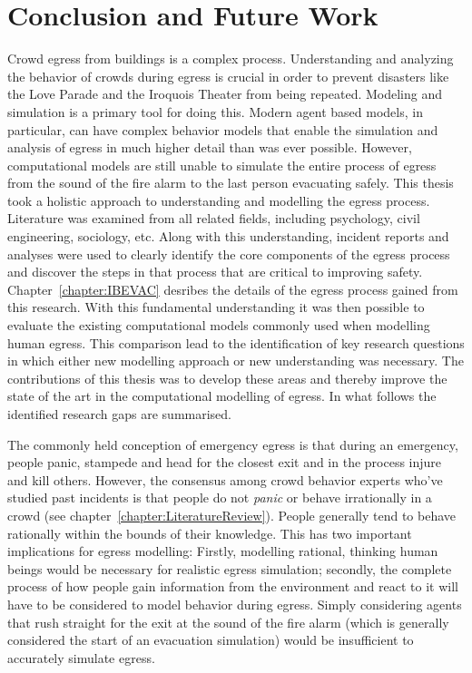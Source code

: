 \chapter{Conclusion and Future Work}
\label{chapter:finale}

Crowd egress from buildings is a complex process. Understanding and analyzing the behavior of crowds during egress is crucial in order to prevent disasters like the Love Parade and the Iroquois Theater from being repeated. Modeling and simulation is a primary tool for doing this. Modern agent based models, in particular, can have complex behavior models that enable the simulation and analysis of egress in much higher detail than was ever possible. However, computational models are still unable to simulate the entire process of egress from the sound of the fire alarm to the last person evacuating safely. This thesis took a holistic approach to understanding and modelling the egress process. Literature was examined from all related fields, including psychology, civil engineering, sociology, etc. Along with this understanding, incident reports and analyses were used to clearly identify the core components of the egress process and discover the steps in that process that are critical to improving safety. Chapter~\ref{chapter:IBEVAC} desribes the details of the egress process gained from this research. With this fundamental understanding it was then possible to evaluate the existing computational models commonly used when modelling human egress. This comparison lead to the identification of key research questions in which either new modelling approach or new understanding was necessary. The contributions of this thesis was to develop these areas and thereby improve the state of the art in the computational modelling of egress. In what follows the identified research gaps are summarised.

 The commonly held conception of emergency egress is that during an emergency, people panic, stampede and head for the closest exit and in the process injure and kill others. However, the consensus among crowd behavior experts who've studied past incidents is that people do not \emph{panic} or behave irrationally in a crowd (see chapter~\ref{chapter:LiteratureReview}). People generally tend to behave rationally within the bounds of their knowledge. This has two important implications for egress modelling: Firstly, modelling rational, thinking human beings would be necessary for realistic egress simulation; secondly, the complete process of how people gain information from the environment and react to it will have to be considered to model behavior during egress. Simply considering agents that rush straight for the exit at the sound of the fire alarm (which is generally considered the start of an evacuation simulation) would be insufficient to accurately simulate egress.

